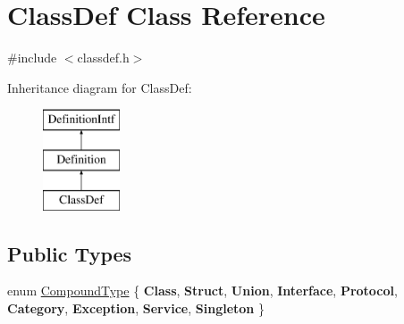 \hypertarget{class_class_def}{}\section{Class\+Def Class Reference}
\label{class_class_def}


{\ttfamily \#include $<$classdef.\+h$>$}

Inheritance diagram for Class\+Def\+:\begin{figure}[H]
\begin{center}
\leavevmode
\includegraphics[height=3.000000cm]{class_class_def}
\end{center}
\end{figure}
\subsection*{Public Types}
\begin{DoxyCompactItemize}
\item 
enum \mbox{\hyperlink{class_class_def_ae70cf86d35fe954a94c566fbcfc87939}{Compound\+Type}} \{ \newline
{\bfseries Class}, 
{\bfseries Struct}, 
{\bfseries Union}, 
{\bfseries Interface}, 
\newline
{\bfseries Protocol}, 
{\bfseries Category}, 
{\bfseries Exception}, 
{\bfseries Service}, 
\newline
{\bfseries Singleton}
 \}
\end{DoxyCompactItemize}
